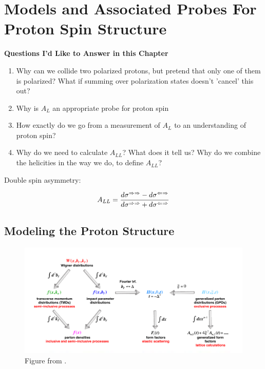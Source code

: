 \chapter{Models and Associated Probes For Proton Spin Structure}
\label{ch:modeling_proton_spin}

\textbf{Questions I'd Like to Answer in this Chapter}
\begin{enumerate}
    \item Why can we collide two polarized protons, but pretend that only one of
      them is polarized? What if summing over polarization states doesn't
      'cancel' this out?
    \item Why is $A_L$ an appropriate probe for proton spin
    \item How exactly do we go from a measurement of $A_L$ to an understanding
      of proton spin?
    \item Why do we need to calculate $A_{LL}$? What does it tell us? Why do we
      combine the helicities in the way we do, to define $A_{LL}$?
\end{enumerate}

Double spin asymmetry:

\begin{equation}
  A_{LL} = {
    {d\sigma^{\Rightarrow\Rightarrow}-d\sigma^{\Leftarrow\Rightarrow}}
    \over
    {d\sigma^{\Rightarrow\Rightarrow}+d\sigma^{\Leftarrow\Rightarrow}}
  }
\end{equation}


\section{Modeling the Proton Structure}

\begin{figure}[ht]
  \centering
  \includegraphics[width=\linewidth]{./figures/pdf_distributions_invariants.png}
  \caption{
    Figure from \cite{Accardi2012}.
  }
  \label{fig:invariants_observables_pdf}
\end{figure}

